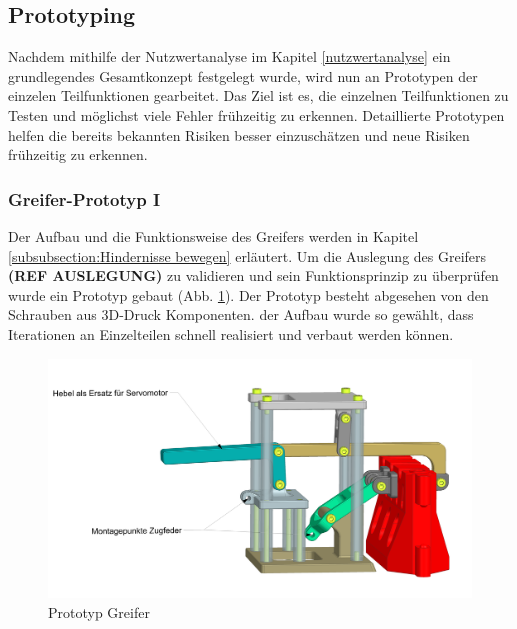 \subsection{Prototyping}

Nachdem mithilfe der Nutzwertanalyse im Kapitel \ref{nutzwertanalyse} ein grundlegendes Gesamtkonzept festgelegt wurde, wird nun an Prototypen der einzelen Teilfunktionen gearbeitet. Das Ziel ist es, die einzelnen Teilfunktionen zu Testen und möglichst viele Fehler frühzeitig zu erkennen. Detaillierte Prototypen helfen die bereits bekannten Risiken besser einzuschätzen und neue Risiken frühzeitig zu erkennen.

\subsubsection{Greifer-Prototyp I}
\label{subsubsection:gripper-prototype-1}


Der Aufbau und die Funktionsweise des Greifers werden in Kapitel \ref{subsubsection:Hindernisse bewegen} erläutert. Um die Auslegung des Greifers \textbf{(REF AUSLEGUNG)} zu validieren und sein Funktionsprinzip zu überprüfen wurde ein Prototyp gebaut (Abb. \ref{fig:gripper-prototype-trimetric-notes}). Der Prototyp besteht abgesehen von den Schrauben aus 3D-Druck Komponenten. der Aufbau wurde so gewählt, dass Iterationen an Einzelteilen schnell realisiert und verbaut werden können. 

\begin{figure}[H]
\centering
\includegraphics[width=1.0\textwidth]{assets/greifer-prototyp/Greifer_Trimetrisch_Notes.png}
\caption{Prototyp Greifer}
\label{fig:gripper-prototype-trimetric-notes}
\end{figure}

